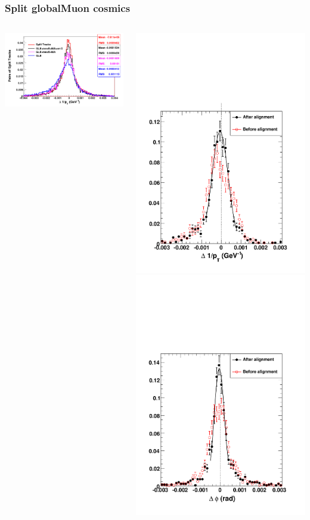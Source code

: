 \documentclass[compress]{beamer}
\begin{document}
\begin{frame}
\frametitle{Split globalMuon cosmics}

\begin{columns}

\includegraphics[width=\linewidth]{globalMuons_fixed.png}

\includegraphics[width=0.5\linewidth]{delta_curv.pdf} \includegraphics[width=0.5\linewidth]{delta_phi.pdf}


\end{columns}
\end{frame}
\end{document}
